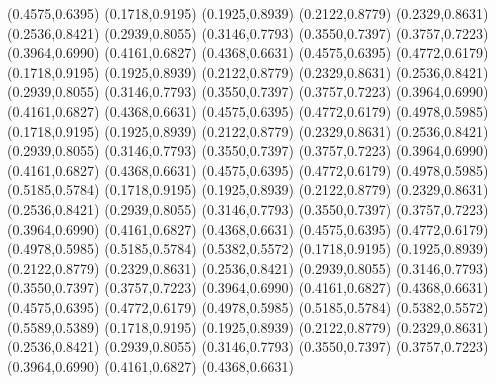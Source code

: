 \PST@Diamond(0.4575,0.6395)
\PST@Diamond(0.1718,0.9195)
\PST@Diamond(0.1925,0.8939)
\PST@Diamond(0.2122,0.8779)
\PST@Diamond(0.2329,0.8631)
\PST@Diamond(0.2536,0.8421)
\PST@Diamond(0.2939,0.8055)
\PST@Diamond(0.3146,0.7793)
\PST@Diamond(0.3550,0.7397)
\PST@Diamond(0.3757,0.7223)
\PST@Diamond(0.3964,0.6990)
\PST@Diamond(0.4161,0.6827)
\PST@Diamond(0.4368,0.6631)
\PST@Diamond(0.4575,0.6395)
\PST@Diamond(0.4772,0.6179)
\PST@Diamond(0.1718,0.9195)
\PST@Diamond(0.1925,0.8939)
\PST@Diamond(0.2122,0.8779)
\PST@Diamond(0.2329,0.8631)
\PST@Diamond(0.2536,0.8421)
\PST@Diamond(0.2939,0.8055)
\PST@Diamond(0.3146,0.7793)
\PST@Diamond(0.3550,0.7397)
\PST@Diamond(0.3757,0.7223)
\PST@Diamond(0.3964,0.6990)
\PST@Diamond(0.4161,0.6827)
\PST@Diamond(0.4368,0.6631)
\PST@Diamond(0.4575,0.6395)
\PST@Diamond(0.4772,0.6179)
\PST@Diamond(0.4978,0.5985)
\PST@Diamond(0.1718,0.9195)
\PST@Diamond(0.1925,0.8939)
\PST@Diamond(0.2122,0.8779)
\PST@Diamond(0.2329,0.8631)
\PST@Diamond(0.2536,0.8421)
\PST@Diamond(0.2939,0.8055)
\PST@Diamond(0.3146,0.7793)
\PST@Diamond(0.3550,0.7397)
\PST@Diamond(0.3757,0.7223)
\PST@Diamond(0.3964,0.6990)
\PST@Diamond(0.4161,0.6827)
\PST@Diamond(0.4368,0.6631)
\PST@Diamond(0.4575,0.6395)
\PST@Diamond(0.4772,0.6179)
\PST@Diamond(0.4978,0.5985)
\PST@Diamond(0.5185,0.5784)
\PST@Diamond(0.1718,0.9195)
\PST@Diamond(0.1925,0.8939)
\PST@Diamond(0.2122,0.8779)
\PST@Diamond(0.2329,0.8631)
\PST@Diamond(0.2536,0.8421)
\PST@Diamond(0.2939,0.8055)
\PST@Diamond(0.3146,0.7793)
\PST@Diamond(0.3550,0.7397)
\PST@Diamond(0.3757,0.7223)
\PST@Diamond(0.3964,0.6990)
\PST@Diamond(0.4161,0.6827)
\PST@Diamond(0.4368,0.6631)
\PST@Diamond(0.4575,0.6395)
\PST@Diamond(0.4772,0.6179)
\PST@Diamond(0.4978,0.5985)
\PST@Diamond(0.5185,0.5784)
\PST@Diamond(0.5382,0.5572)
\PST@Diamond(0.1718,0.9195)
\PST@Diamond(0.1925,0.8939)
\PST@Diamond(0.2122,0.8779)
\PST@Diamond(0.2329,0.8631)
\PST@Diamond(0.2536,0.8421)
\PST@Diamond(0.2939,0.8055)
\PST@Diamond(0.3146,0.7793)
\PST@Diamond(0.3550,0.7397)
\PST@Diamond(0.3757,0.7223)
\PST@Diamond(0.3964,0.6990)
\PST@Diamond(0.4161,0.6827)
\PST@Diamond(0.4368,0.6631)
\PST@Diamond(0.4575,0.6395)
\PST@Diamond(0.4772,0.6179)
\PST@Diamond(0.4978,0.5985)
\PST@Diamond(0.5185,0.5784)
\PST@Diamond(0.5382,0.5572)
\PST@Diamond(0.5589,0.5389)
\PST@Diamond(0.1718,0.9195)
\PST@Diamond(0.1925,0.8939)
\PST@Diamond(0.2122,0.8779)
\PST@Diamond(0.2329,0.8631)
\PST@Diamond(0.2536,0.8421)
\PST@Diamond(0.2939,0.8055)
\PST@Diamond(0.3146,0.7793)
\PST@Diamond(0.3550,0.7397)
\PST@Diamond(0.3757,0.7223)
\PST@Diamond(0.3964,0.6990)
\PST@Diamond(0.4161,0.6827)
\PST@Diamond(0.4368,0.6631)
